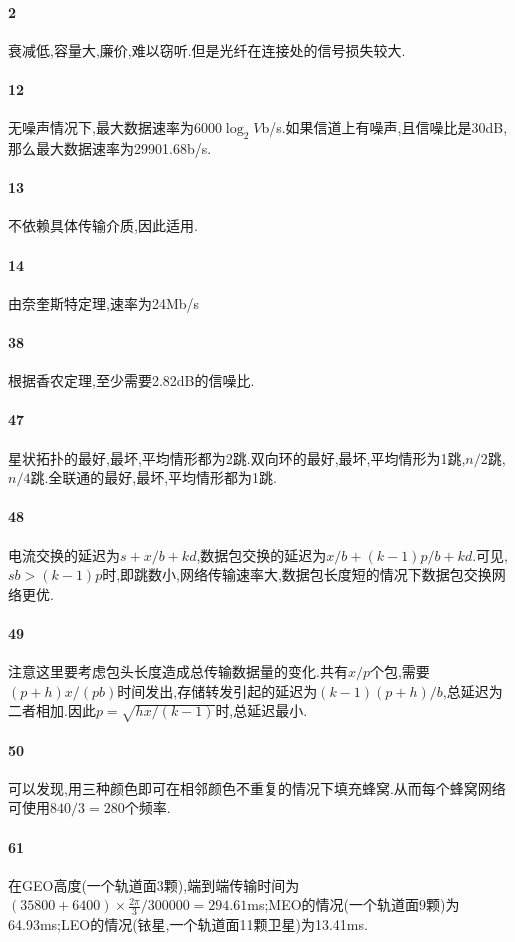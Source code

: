 \documentclass[a4paper]{article}
\begin{document}
\paragraph{2}
衰减低,容量大,廉价,难以窃听.但是光纤在连接处的信号损失较大.
\paragraph{12}
无噪声情况下,最大数据速率为6000$\log_2V$b/s.如果信道上有噪声,且信噪比是30dB,那么最大数据速率为29901.68b/s.
\paragraph{13}
不依赖具体传输介质,因此适用.
\paragraph{14}
由奈奎斯特定理,速率为24Mb/s
\paragraph{38}
根据香农定理,至少需要2.82dB的信噪比.
\paragraph{47}
星状拓扑的最好,最坏,平均情形都为2跳.双向环的最好,最坏,平均情形为1跳,$n/2$跳,$n/4$跳.全联通的最好,最坏,平均情形都为1跳.
\paragraph{48}
电流交换的延迟为$s+x/b+kd$,数据包交换的延迟为$x/b+(k-1)p/b+kd$.可见,$sb>(k-1)p$时,即跳数小,网络传输速率大,数据包长度短的情况下数据包交换网络更优.
\paragraph{49}
注意这里要考虑包头长度造成总传输数据量的变化.共有$x/p$个包,需要$(p+h)x/(pb)$时间发出,存储转发引起的延迟为$(k-1)(p+h)/b$,总延迟为二者相加.因此$p=\sqrt{hx/(k-1)}$时,总延迟最小.
\paragraph{50}
可以发现,用三种颜色即可在相邻颜色不重复的情况下填充蜂窝.从而每个蜂窝网络可使用$840/3=280$个频率.
\paragraph{61}
在GEO高度(一个轨道面3颗),端到端传输时间为$(35800+6400)\times\frac{2\pi}{3}/300000=294.61$ms;MEO的情况(一个轨道面9颗)为64.93ms;LEO的情况(铱星,一个轨道面11颗卫星)为13.41ms.
\end{document}
